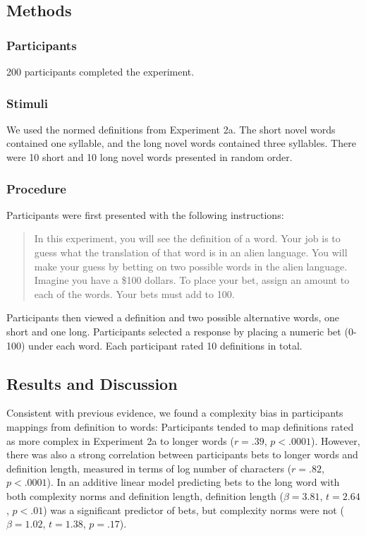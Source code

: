 \subsection{Methods}
\subsubsection{Participants}
200 participants completed the experiment.
\subsubsection{Stimuli}
We used the normed definitions from Experiment 2a. The short novel words contained one syllable, and the long novel words contained three syllables. There were 10 short and 10 long novel words presented in random order. 
\subsubsection{Procedure}
Participants were first presented with the following instructions:
\begin{quote}
In this experiment, you will see the definition of a word. Your job is to guess what the translation of that word is in an alien language. You will make your guess by betting on two possible words in the alien language. Imagine you have a \$100 dollars. To place your bet, assign an amount to each of the words. Your bets must add to 100.
\end{quote}
Participants then viewed a definition and two possible alternative words, one short and one long. Participants selected a response by placing a numeric bet (0-100) under each word.  Each participant rated 10 definitions in total. 

\subsection{Results and Discussion}
Consistent with previous evidence, we found a complexity bias in participants mappings from definition to words: Participants tended to map definitions rated as more complex in Experiment 2a to longer words ($r = .39$,  $p< .0001$). However, there was also a strong correlation between participants bets to longer words and definition length, measured in terms of log number of characters ($r = .82$, $p< .0001$). In an additive linear model predicting bets to the long word with both complexity norms and definition length, definition length ($\beta=3.81$, $t =2.64$, $p<.01$) was a significant predictor of bets, but complexity norms were not ($\beta=1.02$, $t =1.38$, $p=.17$). 

